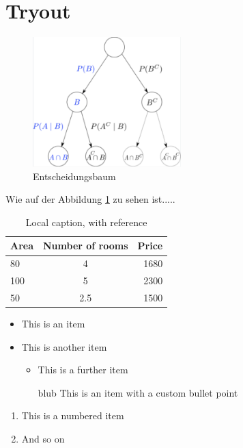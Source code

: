 \newpage
\section{Tryout}\label{sec:tryout}

\begin{figure}[H]	%
	\centering
	\includegraphics[height=5cm]{figures/tryout.png}
	\caption[Optional optional]{Entscheidungsbaum}
	\label{fig:tryout}
\end{figure}

Wie auf der Abbildung \ref{fig:tryout} zu sehen ist.....


\begin{table}[H]
	\centering
	\label{tab:tryouttab}
\caption[This is an optional caption, without reference]{Local caption, with reference}
	\cite{ref:ds_1, ref:nn_1, ref:ai_1}	%

	\begin{tabular}{l c r}
		Area & Number of rooms & Price \\ \hline
		80	& 4				& 1680 \\
		100	& 5				& 2300 \\
		50	& 2.5				& 1500 \\

	\end{tabular}
\end{table}


\begin{itemize}
	\item This is an item
	\item This is another item
	\begin{itemize}
		\item This is a further item
		\item [blub] This is an item with a custom bullet point
	\end{itemize}
\end{itemize}

\begin{enumerate}
	\item This is a numbered item
	\item And so on
\end{enumerate}


